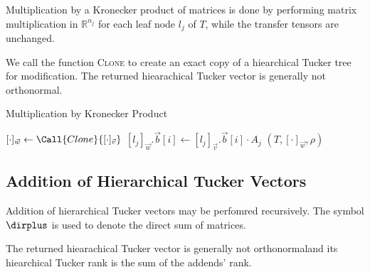 Multiplication by a Kronecker product of matrices is done by
performing matrix multiplication in $\mathbb{R}^{n_j}$ for each leaf
node $l_j$ of $T$, while the transfer tensors are unchanged.

We call the function \textsc{Clone} to create an exact copy of a
hiearchical Tucker tree for modification. The returned hiearachical
Tucker vector is generally not orthonormal.

\begin{algorithm}
  \caption{Multiplication by Kronecker Product}
  \begin{algorithmic}[1]
    \State $[\cdot]_{\vec{w}} \gets \Call{Clone}{[\cdot]_{\vec{v}}}$
    \State $[l_j]_{\vec{w}}.\vec{b}[i] \gets
    [l_j]_{\vec{v}}.\vec{b}[i] \cdot A_j$
    \EndFor
    \EndFor
    \State \Return $(T, [\cdot]_{\vec{w}}, \rho)$
    \EndFunction
  \end{algorithmic}
\end{algorithm}

\subsection{Addition of Hierarchical Tucker Vectors}

Addition of hierarchical Tucker vectors may be perfomred
recursively. The symbol $\dirplus$ is used to denote the direct sum of
matrices.

The returned hiearachical Tucker vector is generally not
orthonormaland its hiearchical Tucker rank is the sum of the addends'
rank.

